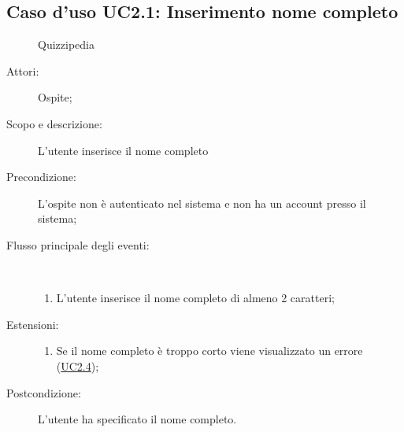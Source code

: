 \subsection{Caso d'uso UC2.1: Inserimento nome completo}
	\begin{figure}[H]
		\centering
		\begin{resizedtikzpicture}{\textwidth}
		\begin{umlsystem}[x=0, fill=lightgray!20]{Quizzipedia}
		\end{umlsystem}
		\end{resizedtikzpicture}
		\caption{}
	\end{figure}
\begin{description}
\item[Attori:] Ospite;
\item[Scopo e descrizione:] L'utente inserisce il nome completo
      \item[Precondizione:] L'ospite non è autenticato nel sistema e non ha un account presso il sistema;

        \item[Flusso principale degli eventi:] \ 
 \begin{enumerate}
          \item L'utente inserisce il nome completo di almeno 2 caratteri;

      \end{enumerate}
    \item[Estensioni:]
      \begin{enumerate}
          \item Se il nome completo è troppo corto viene visualizzato un errore (\hyperlink{UC2.4}{UC2.4});

      \end{enumerate}
    \item[Postcondizione:] L'utente ha specificato il nome completo.
  \end{description}
\hypertarget{UC2.2}{}
